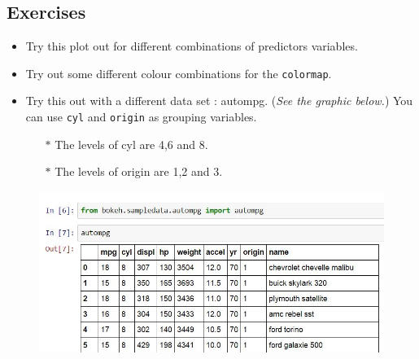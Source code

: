 \documentclass[a4paper,12pt]{article}
\begin{document}
\subsection*{Exercises}
\begin{itemize}
\item Try this plot out for different combinations
of predictors variables.
\item Try out some different colour combinations for the \texttt{colormap}.
\item Try this out with a different data set : autompg. (\textit{See the graphic below.})  You can use \texttt{cyl} and \texttt{origin} as grouping variables. \begin{itemize}\item[$\ast$] The levels of cyl are 4,6 and 8. \item[$\ast$] The levels of origin are 1,2 and 3.
\end{itemize}
\end{itemize}
\begin{figure}[h!]
\centering
\includegraphics[width=0.9\linewidth]{images/autompg}
\end{figure}
\end{document}
